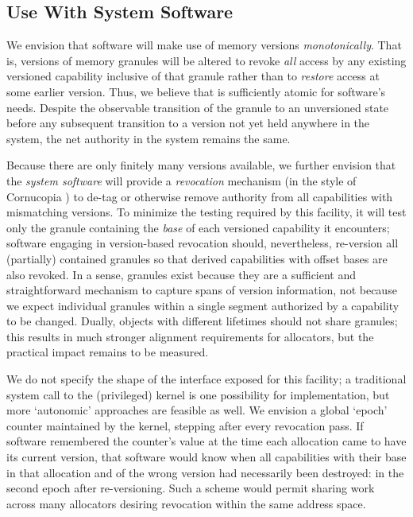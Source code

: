\subsection{Use With System Software} %
\label{app:exp:versioning:syssoft}

We envision that software will make use of memory versions
\emph{monotonically}.  That is, versions of memory granules will be altered to
revoke \emph{all} access by any existing versioned capability inclusive of that
granule rather than to \emph{restore} access at some earlier version.  Thus, we
believe that  is sufficiently atomic for
software's needs.  Despite the observable transition of the granule to an
unversioned state before any subsequent transition to a version not yet held
anywhere in the system, the net authority in the system remains the same.

Because there are only finitely many versions available, we further envision
that the \emph{system software} will provide a \emph{revocation} mechanism (in
the style of Cornucopia \cite{cornucopia}) to de-tag or otherwise remove
authority from all capabilities with mismatching versions.  To minimize the
testing required by this facility, it will test only the granule containing the
\emph{base} of each versioned capability it encounters; software engaging in
version-based revocation should, nevertheless, re-version all (partially)
contained granules so that derived capabilities with offset bases are also
revoked.  In a sense, granules exist because they are a sufficient and
straightforward mechanism to capture spans of version information, not because
we expect individual granules within a single segment authorized by a
capability to be changed.  Dually, objects with different lifetimes should not
share granules; this results in much stronger alignment requirements for
allocators, but the practical impact remains to be measured.

We do not specify the shape of the interface exposed for this facility; a
traditional system call to the (privileged) kernel is one possibility for
implementation, but more `autonomic' approaches are feasible as well.  We
envision a global `epoch' counter maintained by the kernel, stepping after
every revocation pass.  If software remembered the counter's value at the time
each allocation came to have its current version, that software would know when
all capabilities with their base in that allocation and of the wrong version
had necessarily been destroyed: in the second epoch after re-versioning.  Such
a scheme would permit sharing work across many allocators desiring revocation
within the same address space.

